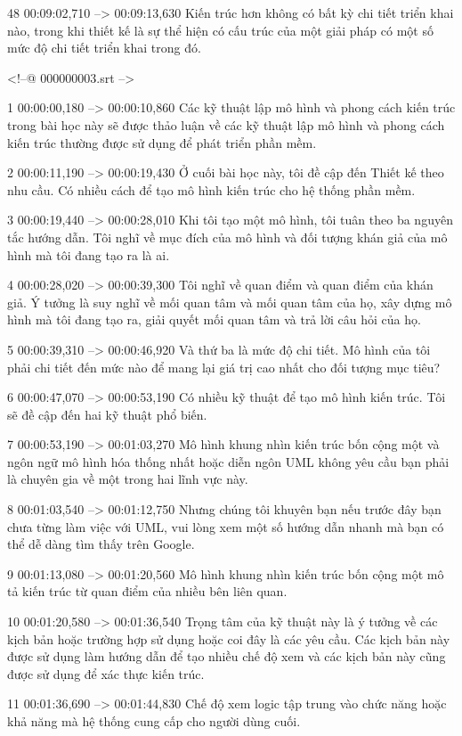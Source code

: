 48
00:09:02,710 --> 00:09:13,630
Kiến trúc hơn không có bất kỳ chi tiết triển khai nào, trong khi thiết kế là sự thể hiện có cấu trúc của một giải pháp có một số mức độ chi tiết triển khai trong đó.

<!--@ 000000003.srt -->

1
00:00:00,180 --> 00:00:10,860
Các kỹ thuật lập mô hình và phong cách kiến ​​trúc trong bài học này sẽ được thảo luận về các kỹ thuật lập mô hình và phong cách kiến ​​trúc thường được sử dụng để phát triển phần mềm.

2
00:00:11,190 --> 00:00:19,430
Ở cuối bài học này, tôi đề cập đến Thiết kế theo nhu cầu.  Có nhiều cách để tạo mô hình kiến ​​trúc cho hệ thống phần mềm.

3
00:00:19,440 --> 00:00:28,010
Khi tôi tạo một mô hình, tôi tuân theo ba nguyên tắc hướng dẫn.  Tôi nghĩ về mục đích của mô hình và đối tượng khán giả của mô hình mà tôi đang tạo ra là ai.

4
00:00:28,020 --> 00:00:39,300
Tôi nghĩ về quan điểm và quan điểm của khán giả.  Ý tưởng là suy nghĩ về mối quan tâm và mối quan tâm của họ, xây dựng mô hình mà tôi đang tạo ra, giải quyết mối quan tâm và trả lời câu hỏi của họ.

5
00:00:39,310 --> 00:00:46,920
Và thứ ba là mức độ chi tiết.  Mô hình của tôi phải chi tiết đến mức nào để mang lại giá trị cao nhất cho đối tượng mục tiêu?

6
00:00:47,070 --> 00:00:53,190
Có nhiều kỹ thuật để tạo mô hình kiến ​​trúc.  Tôi sẽ đề cập đến hai kỹ thuật phổ biến.

7
00:00:53,190 --> 00:01:03,270
Mô hình khung nhìn kiến ​​trúc bốn cộng một và ngôn ngữ mô hình hóa thống nhất hoặc diễn ngôn UML không yêu cầu bạn phải là chuyên gia về một trong hai lĩnh vực này.

8
00:01:03,540 --> 00:01:12,750
Nhưng chúng tôi khuyên bạn nếu trước đây bạn chưa từng làm việc với UML, vui lòng xem một số hướng dẫn nhanh mà bạn có thể dễ dàng tìm thấy trên Google.

9
00:01:13,080 --> 00:01:20,560
Mô hình khung nhìn kiến ​​trúc bốn cộng một mô tả kiến ​​trúc từ quan điểm của nhiều bên liên quan.

10
00:01:20,580 --> 00:01:36,540
Trọng tâm của kỹ thuật này là ý tưởng về các kịch bản hoặc trường hợp sử dụng hoặc coi đây là các yêu cầu.  Các kịch bản này được sử dụng làm hướng dẫn để tạo nhiều chế độ xem và các kịch bản này cũng được sử dụng để xác thực kiến ​​trúc.

11
00:01:36,690 --> 00:01:44,830
Chế độ xem logic tập trung vào chức năng hoặc khả năng mà hệ thống cung cấp cho người dùng cuối.

